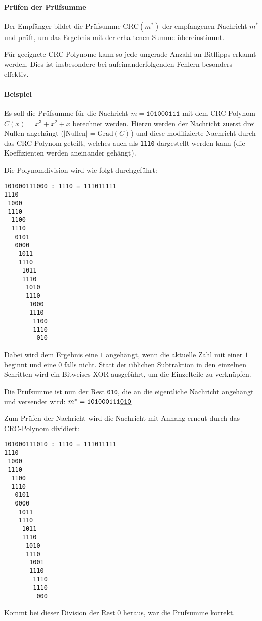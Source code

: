             \paragraph{Prüfen der Prüfsumme}
                Der Empfänger bildet die Prüfsumme \( \textrm{CRC}(m^*) \) der empfangenen Nachricht \( m^* \) und prüft, um das Ergebnis mit der erhaltenen Summe übereinstimmt.
                
                Für geeignete CRC-Polynome kann so jede ungerade Anzahl an Bitflipps erkannt werden. Dies ist insbesondere bei aufeinanderfolgenden Fehlern besonders effektiv.
            
            \paragraph{Beispiel}
                Es soll die Prüfsumme für die Nachricht \( m = \texttt{101000111} \) mit dem CRC-Polynom \( C(x) = x^3 + x^2 + x \) berechnet werden. Hierzu werden der Nachricht zuerst drei Nullen angehängt (\( \lvert\text{Nullen}\rvert = \text{Grad}(C) \)) und diese modifizierte Nachricht durch das CRC-Polynom geteilt, welches auch als \texttt{1110} dargestellt werden kann (die Koeffizienten werden aneinander gehängt).
                
                Die Polynomdivision wird wie folgt durchgeführt:
                \begin{center}
                	\begin{BVerbatim}
101000111000 : 1110 = 111011111
1110
 1000
 1110
  1100
  1110
   0101
   0000
    1011
    1110
     1011
     1110
      1010
      1110
       1000
       1110
        1100
        1110
         010
\end{BVerbatim}
                \end{center}
                Dabei wird dem Ergebnis eine \(1\) angehängt, wenn die aktuelle Zahl mit einer \(1\) beginnt und eine \(0\) falls nicht. Statt der üblichen Subtraktion in den einzelnen Schritten wird ein Bitweises XOR ausgeführt, um die Einzelteile zu verknüpfen.
                
                Die Prüfsumme ist nun der Rest \texttt{010}, die an die eigentliche Nachricht angehängt und versendet wird: \( m^* = \texttt{101000111\underline{010}} \)
                
                Zum Prüfen der Nachricht wird die Nachricht mit Anhang erneut durch das CRC-Polynom dividiert:
                \begin{center}
                	\begin{BVerbatim}
101000111010 : 1110 = 111011111
1110
 1000
 1110
  1100
  1110
   0101
   0000
    1011
    1110
     1011
     1110
      1010
      1110
       1001
       1110
        1110
        1110
         000
\end{BVerbatim}
                \end{center}
                Kommt bei dieser Division der Rest \(0\) heraus, war die Prüfsumme korrekt.

